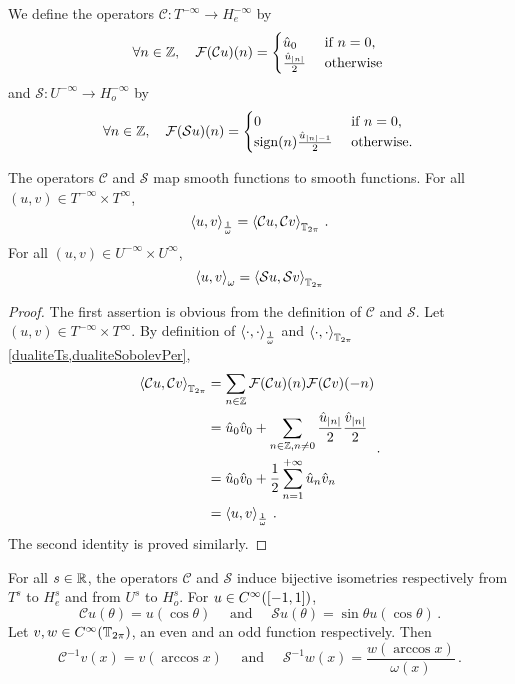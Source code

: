 \documentclass[a4paper]{article}
\begin{document}
\begin{Def}
	We define the operators $\mathcal{C} : T^{-\infty} \to H^{-\infty}_e$ by 
	\[\forall n \in \mathbb{Z}, \quad \mathcal{F}(\mathcal{C}u)(n) = \begin{cases}
	\hat{u}_0 & \text{ if } n = 0,\\
	\frac{\hat{u}_{\left\lvert n \right\rvert}}{2} & \text{ otherwise}	\end{cases}\,\]
	and $\mathcal{S} : U^{-\infty} \to H^{-\infty}_o$ by 
	\[\forall n \in \mathbb{Z}, \quad \mathcal{F}(\mathcal{S}u)(n) = \begin{cases}
	0 & \text{ if } n = 0,\\
	\textup{sign}(n)\frac{\hat{u}_{\left\lvert n \right\rvert-1}}{2} & \text{ otherwise.}	\end{cases}\,\]
\end{Def}
\begin{Lem}
	\label{FormuleDualitesCetS}
	The operators $\mathcal{C}$ and $\mathcal{S}$ map smooth functions to smooth functions. For all $(u,v) \in T^{-\infty} \times T^{\infty}$, 
	\[\left\langle u,v\right\rangle_{\frac{1}{\omega}} = \left\langle \mathcal{C}u,\mathcal{C}v\right\rangle_{\mathbb{T}_{2\pi}}\,.\]
	For all $(u,v) \in U^{-\infty} \times U^{\infty}$,
	\[\left\langle u,v\right\rangle_{{\omega}} = \left\langle \mathcal{S}u,\mathcal{S}v\right\rangle_{\mathbb{T}_{2\pi}}\]
\end{Lem}
\begin{proof}
	The first assertion is obvious from the definition of $\mathcal{C}$ and $\mathcal{S}$. Let $(u,v) \in T^{-\infty}\times T^{\infty}$. By definition of $\left\langle \cdot,\cdot\right\rangle_\frac{1}{\omega}$  and $\left\langle \cdot,\cdot\right\rangle_{\mathbb{T}_{2\pi}}$ \cref{dualiteTs,dualiteSobolevPer},
	\[\begin{split}
	\left\langle \mathcal{C}u,\mathcal{C}v\right\rangle_{\mathbb{T}_{2\pi}}&= \sum_{n \in \mathbb{Z}}\mathcal{F}(\mathcal{C}u)(n)\mathcal{F}(\mathcal{C}v)(-n)\\ 
	&= \hat{u}_0 \hat{v}_0 + \sum_{n \in \mathbb{Z}, n \neq 0} \frac{\hat{u}_{\left\lvert n \right\rvert}}{2}\frac{\hat{v}_{\left\lvert n \right\rvert}}{2}\\
	&= \hat{u}_0 \hat{v}_0 + \frac{1}{2}\sum_{n = 1}^{+ \infty} \hat{u}_{n} \hat{v}_{n} \\
	&= \left\langle u,v\right\rangle_\frac{1}{\omega}\,.
	\end{split}\,. \]
	The second identity is proved similarly.
\end{proof}
\begin{Lem}
	\label{lemChar}
	For all $s \in \mathbb{R}$, the operators $\mathcal{C}$ and $\mathcal{S}$ induce bijective isometries respectively from $T^s$ to $H^s_e$ and from $U^s$ to $H^s_o$. For $u \in C^{\infty}([-1,1])$, 
	\begin{equation}
		\mathcal{C}u(\theta) = u(\cos\theta)
		\quad \text{ and } \quad \mathcal{S}u(\theta) = \sin\theta u(\cos\theta)\,.
		\label{CS}
	\end{equation}
	Let $v,w \in C^{\infty}(\mathbb{T}_{2\pi})$, an even and an odd function respectively. Then
	\begin{equation}
	\label{C-1S-1}
		\mathcal{C}^{-1}v(x) = v(\arccos x) \quad \text{ and } \quad \mathcal{S}^{-1}w(x) = \frac{w(\arccos x)}{\omega(x)}\,.
	\end{equation}
\end{Lem}
\end{document}
